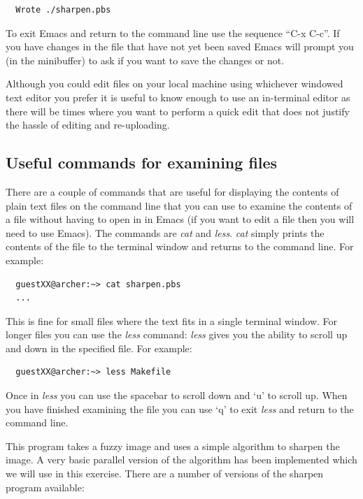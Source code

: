 \documentclass{article}
\begin{document}
\begin{verbatim}
  Wrote ./sharpen.pbs
\end{verbatim}

To exit Emacs and return to the command line use the sequence ``C-x
C-c''. If you have changes in the file that have not yet been saved
Emacs will prompt you (in the minibuffer) to ask if you want to save
the changes or not.

Although you could edit files on your local machine using whichever
windowed text editor you prefer it is useful to know enough to use an
in-terminal editor as there will be times where you want to perform a
quick edit that does not justify the hassle of editing and
re-uploading.

\subsection{Useful commands for examining files}
\label{sec-3-4}


There are a couple of commands that are useful for displaying the
contents of plain text files on the command line that you can use to
examine the contents of a file without having to open in in Emacs (if
you want to edit a file then you will need to use Emacs). The commands
are \emph{cat} and \emph{less}. \emph{cat} simply prints the contents of the file to
the terminal window and returns to the command line. For example:


\begin{verbatim}
  guestXX@archer:~> cat sharpen.pbs
  ...
\end{verbatim}

This is fine for small files where the text fits in a single terminal
window. For longer files you can use the \emph{less} command: \emph{less} gives
you the ability to scroll up and down in the specified file. For
example:

\begin{verbatim}
  guestXX@archer:~> less Makefile
\end{verbatim}

Once in \emph{less} you can use the spacebar to scroll down and `u' to
scroll up. When you have finished examining the file you can use `q'
to exit \emph{less} and return to the command line.



This program takes a fuzzy image and uses a simple algorithm to
sharpen the image. A very basic parallel version of the algorithm has
been implemented which we will use in this exercise.  There are a
number of versions of the sharpen program available:
\end{document}
